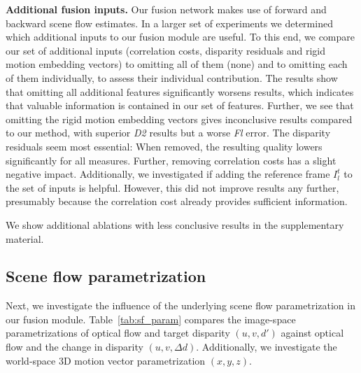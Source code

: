 \documentclass[10pt,twocolumn,letterpaper]{article}
\begin{document}
\medskip
\noindent
\textbf{Additional fusion inputs.}
Our fusion network makes use of forward and backward scene flow estimates.
In a larger set of experiments we determined which additional inputs to our fusion module are useful.
To this end, we compare our set of additional inputs (correlation costs, disparity residuals and rigid motion embedding vectors) to omitting all of them (none) and to omitting each of them individually, to assess their individual contribution.
The results show that omitting all additional features significantly worsens results, which indicates that valuable information is contained in our set of features.
Further, we see that omitting the rigid motion embedding vectors gives inconclusive results compared to our method, with superior \emph{D2} results but a worse \emph{Fl} error.
The disparity residuals seem most essential:
When removed, the resulting quality lowers significantly for all measures.
Further, removing correlation costs has a slight negative impact.
Additionally, we investigated if adding the reference frame $I^{t}_l$ to the set of inputs \cite{Ren2019_FlowTemporalFusion} is helpful.
However, this did not improve results any further, presumably because the correlation cost already provides sufficient information.

We show additional ablations with less conclusive results in the supplementary material.

\subsection{Scene flow parametrization}
Next, we investigate the influence of the underlying scene flow parametrization in our fusion module.
Table~\ref{tab:sf_param} compares the image-space parametrizations of optical flow and target disparity $(u,v,d')$ against optical flow and the change in disparity $(u,v,\Delta d)$.
Additionally, we investigate the world-space 3D motion vector parametrization $(x,y,z)$.
\end{document}
